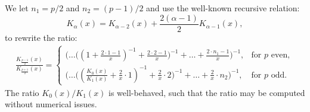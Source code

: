 \documentclass[a4paper,hidelinks]{article}\usepackage[]{graphicx}\usepackage[]{color}
\newcommand{\0}{\bm{0}}
\renewcommand{\(}{\left(}
\renewcommand{\)}{\right)}
\renewcommand{\[}{\left[}
\renewcommand{\]}{\right]}
\begin{document}
\begin{appendix}
		We let $n_1=p/2$ and $n_2=(p-1)/2$ and use the well-known recursive relation:
		$$
		K_{\alpha}(x) = K_{\alpha - 2}(x) + \frac{2(\alpha - 1)}{2} K_{\alpha- 1}(x),
		$$
		to rewrite the ratio:
		\begin{align*}
		\frac{K_{\frac{p - 1}{2}}(x)}{K_{\frac{p + 1}{2}}(x)} = 
		\begin{cases}
		\Big( \dots \Big( \( 1 + \frac{2 \cdot 1 - 1}{x} \)^{-1} + \frac{2 \cdot 2-1}{x}\Big)^{-1} + \dots + \frac{2 \cdot n_1 - 1}{x}\Big)^{-1}, & \text{for } p \text{ even}, \\
		\Big( \dots \Big( \( \frac{K_0(x)}{K_1(x)} + \frac{2}{x} \cdot 1 \)^{-1} + \frac{2}{x} \cdot 2 \Big)^{-1} + \dots + \frac{2}{x} \cdot n_2 \Big)^{-1}, & \text{for } p \text{ odd}.
		\end{cases}
		\end{align*} 
		The ratio $K_0(x)/K_1(x)$ is well-behaved, such that the ratio may be computed without numerical issues.
		

\end{appendix}
\end{document}
